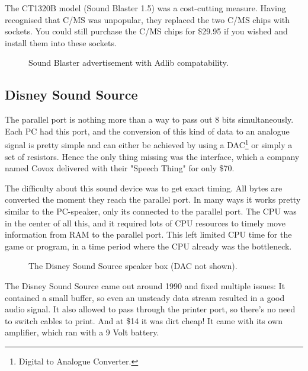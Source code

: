 \documentclass[book.tex]{subfiles}
\begin{document}
\par
   The CT1320B model (Sound Blaster 1.5) was a cost-cutting measure. Having recognised that C/MS was unpopular, they replaced the two C/MS chips with sockets. You could still purchase the C/MS chips for \$29.95 if you wished and install them into these sockets.\\
  


\begin{figure}[H] 
  \centering 
  \caption{Sound Blaster advertisement with Adlib compatability.}
  \label{asb15_advertise}
\end{figure}


  \subsection{Disney Sound Source}
  The parallel port is nothing more than a way to pass out 8 bits simultaneously. Each PC had this port, and the conversion of this kind of data to an analogue signal is pretty simple and can either be achieved by using a DAC\footnote{Digital to Analogue Converter.} or simply a set of resistors. Hence the only thing missing was the interface, which a company named Covox delivered with their "Speech Thing" for only \$70.\\

\par  
   The difficulty about this sound device was to get exact timing. All bytes are converted the moment they reach the parallel port. In many ways it works pretty similar to the PC-speaker, only its connected to the parallel port. The CPU was in the center of all this, and it required lots of CPU resources to timely move information from RAM to the parallel port.  This left limited CPU time for the game or program, in a time period where the CPU already was the bottleneck.\\
   
  \par
  \begin{figure}[H] 
    \centering 
    \caption{The Disney Sound Source speaker box (DAC not shown).}
  \end{figure}
\par   
   
   \par
The Disney Sound Source came out around 1990 and fixed multiple issues: It contained a small buffer, so even an unsteady data stream resulted in a good audio signal. It also allowed to pass through the printer port, so there's no need to switch cables to print. And at \$14 it was dirt cheap! It came with its own amplifier, which ran with a 9 Volt battery. 
\end{document}
